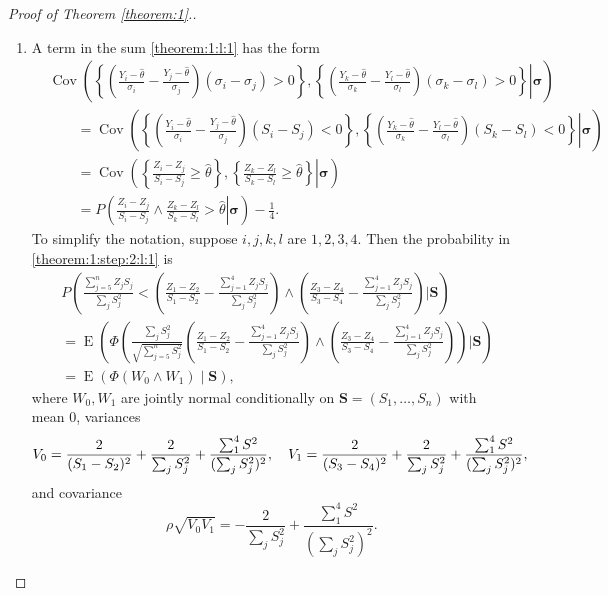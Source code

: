 \documentclass[12pt]{article}
\renewcommand{\P}{P}
\newcommand{\z}{Z}
\newcommand{\y}{Y}
\newcommand{\s}{S}
\newcommand{\w}{W}
\newcommand{\svec}{\vec{S}}
\renewcommand{\vec}[1]{\textbf{#1}}
\newcommand{\zs}[2]{\frac{\z_{#1}-\z_{#2}}{\s_{#1}-\s_{#2}}}
\DeclareMathOperator{\E}{E}
\DeclareMathOperator{\Cov}{Cov}
\begin{document}
\begin{proof}[Proof of Theorem \ref{theorem:1}.]
\begin{enumerate}[wide, labelwidth=!, labelindent=0pt]
  \item\label{theorem:1:step:2}
  A term in the sum \eqref{theorem:1:l:1} has the form
  \begin{align}
    &\Cov\left(\left.
    \left\{\left(\frac{\y_i-\hat\theta}{\sigma_i}-\frac{\y_j-\hat\theta}{\sigma_j}\right)(\sigma_i-\sigma_j)>0\right\},
      \left\{\left(\frac{\y_k-\hat\theta}{\sigma_k}-\frac{\y_l-\hat\theta}{\sigma_l}\right)(\sigma_k-\sigma_l)>0\right\}
    \right|\pmb{\sigma}\right)\\
    &\qquad=\Cov\left(\left.
    \left\{\left(\frac{\y_i-\hat\theta}{\sigma_i}-\frac{\y_j-\hat\theta}{\sigma_j}\right)(\s_i-\s_j)<0\right\},
      \left\{\left(\frac{\y_k-\hat\theta}{\sigma_k}-\frac{\y_l-\hat\theta}{\sigma_l}\right)(\s_k-\s_l)<0\right\}
      \right|\pmb{\sigma}\right)\\
    &\qquad=\Cov\left(\left.
      \left\{\zs{i}{j}\ge\hat\theta\right\},     \left\{\zs{k}{l}\ge\hat\theta\right\}
      \right|\pmb{\sigma}\right)\\
    &\qquad=\P\left(\left.
      \zs{i}{j}\wedge\zs{k}{l} > \hat\theta
      \right|\pmb{\sigma}\right) - \frac{1}{4}.\label{theorem:1:step:2:l:1}
  \end{align}  
  To simplify the notation, suppose $i,j,k,l$ are $1,2,3,4$. Then the probability in \eqref{theorem:1:step:2:l:1} is 
    \begin{align}
      &\P\left(\frac{\sum_{j=5}^n \z_j\s_j}{\sum_j \s_j^2} < \left(\frac{\z_1-\z_2}{\s_1-\s_2}- \frac{\sum_{j=1}^4\z_j\s_j}{\sum_j\s_j^2}  \right)\wedge \left(\frac{\z_3-\z_4}{\s_3-\s_4}- \frac{\sum_{j=1}^4\z_j\s_j}{\sum_j\s_j^2}\right) \bigg\vert \svec\right)\\
      &=\E\left(\Phi\left(\frac{\sum_j\s_j^2}{\sqrt{\sum_{j=5}^n\s_j^2}}\left(\frac{\z_1-\z_2}{\s_1-\s_2}- \frac{\sum_{j=1}^4\z_j\s_j}{\sum_j\s_j^2}  \right)\wedge \left(\frac{\z_3-\z_4}{\s_3-\s_4}- \frac{\sum_{j=1}^4\z_j\s_j}{\sum_j\s_j^2}\right)  \right) \bigg\vert \svec\right)\\
      &=\E\left(\Phi(\w_0\wedge \w_1)\mid \svec\right),\label{thm1:min_exp}
    \end{align}
    where $\w_0,\w_1$ are jointly normal conditionally on $\vec{\s}=(\s_1,\ldots,\s_n)$ with mean $0$, variances
    $$
    V_0=\frac{2}{(\s_1-\s_2)^2} + \frac{2}{\sum_j\s_j^2}+\frac{\sum_{1}^4\s^2}{(\sum_j\s_j^2)^2}, \hspace{10px}    V_1=\frac{2}{(\s_3-\s_4)^2} + \frac{2}{\sum_j\s_j^2}+\frac{\sum_{1}^4\s^2}{(\sum_j\s_j^2)^2},
    $$
    and covariance
    $$
    \rho\sqrt{V_0V_1}=-\frac{2}{\sum_j\s_j^2}+\frac{\sum_{1}^4\s^2}{(\sum_j\s_j^2)^2}.
$$
\end{enumerate}
\end{proof}
\end{document}
